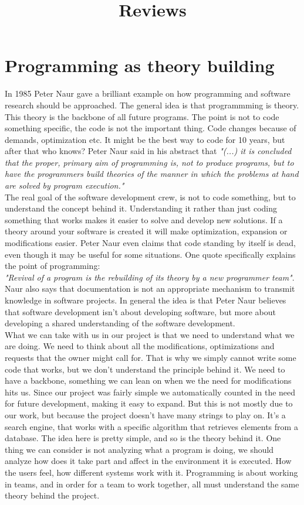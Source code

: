 \documentclass[a4paper]{article}
\title{Reviews}
\begin{document}
\maketitle
\section{Programming as theory building}
In 1985 Peter Naur gave a brilliant example on how programming and software research should be approached. The general idea is that programmming is theory. This theory is the backbone of all future programs. The point is not to code something specific, the code is not the important thing. Code changes because of demands, optimization etc. It might be the best way to code for 10 years, but after that who knows? Peter Naur said in his abstract that \textit{"(...) it is concluded that the proper, primary aim of programming is, not to produce programs, but to have the programmers build theories of the manner in which the problems at hand are solved by program execution."} \\
The real goal of the software development crew, is not to code something, but to understand the concept behind it. Understanding it rather than just coding something that works makes it easier to solve and develop new solutions. If a theory around your software is created it will make optimization, expansion or modifications easier. Peter Naur even claims that code standing by itself is dead, even though it may be useful for some situations. One quote specifically explains the point of programming:\\ \textit{"Revival of a program is the rebuilding of its theory by a new programmer team"}.\\
Naur also says that documentation is not an appropriate mechanism to transmit knowledge in software projects. In general the idea is that Peter Naur believes that software development isn't about developing software, but more about developing a shared understanding of the software development.
\\
What we can take with us in our project is that we need to understand what we are doing. We need to think about all the modifications, optimizations and requests that the owner might call for. That is why we simply cannot write some code that works, but we don't understand the principle behind it. We need to have a backbone, something we can lean on when we the need for modifications hits us. Since our project was fairly simple we automatically counted in the need for future development, making it easy to expand. But this is not mostly due to our work, but because the project doesn't have many strings to play on. It's a search engine, that works with a specific algorithm that retrieves elements from a database. The idea here is pretty simple, and so is the theory behind it. One thing we can consider is not analyzing what a program is doing, we should analyze how does it take part and affect in the environment it is executed. How the users feel, how different systems work with it. Programming is about working in teams, and in order for a team to work together, all must understand the same theory behind the project.
\end{document}
